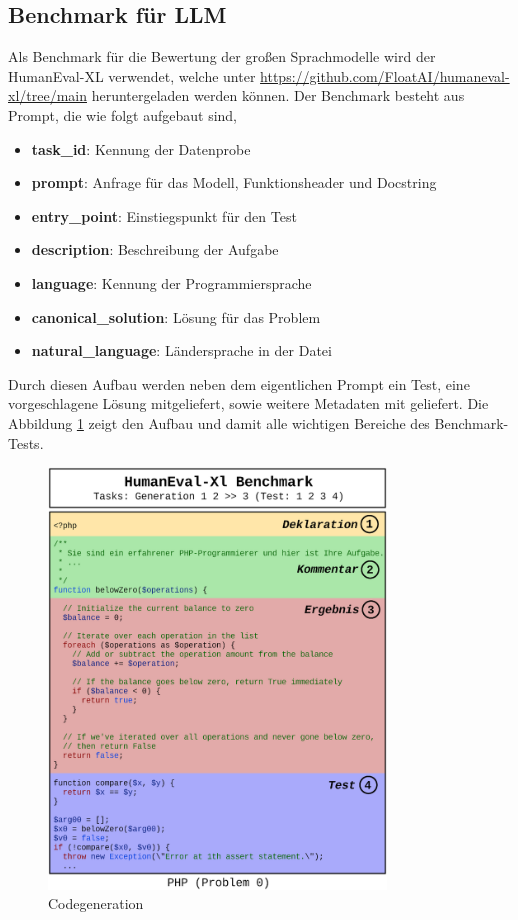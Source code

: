 \subsection{Benchmark für LLM}
Als Benchmark für die Bewertung der großen Sprachmodelle wird der HumanEval-XL verwendet, welche unter \href{https://github.com/FloatAI/humaneval-xl/tree/main}{https://github.com/FloatAI/humaneval-xl/tree/main} heruntergeladen werden können. Der Benchmark besteht aus Prompt, die wie folgt aufgebaut sind,

\begin{itemize}
	\item \textbf{task\_id}: Kennung der Datenprobe
	\item \textbf{prompt}: Anfrage für das Modell, Funktionsheader und Docstring
	\item \textbf{entry\_point}: Einstiegspunkt für den Test
	\item \textbf{description}: Beschreibung der Aufgabe
	\item \textbf{language}: Kennung der Programmiersprache
	\item \textbf{canonical\_solution}: Lösung für das Problem
	\item \textbf{natural\_language}: Ländersprache in der Datei
\end{itemize}

Durch diesen Aufbau werden neben dem eigentlichen Prompt ein Test, eine vorgeschlagene Lösung mitgeliefert, sowie weitere Metadaten mit geliefert. Die Abbildung \ref{img:code_generation_humaneval} zeigt den Aufbau und damit alle wichtigen Bereiche des Benchmark-Tests.

\begin{figure}[!ht]
	\includegraphics[width=0.8\textwidth]{content/chapter_intruduction/images/code_generation_humaneval_x.eps}
	\centering
	\caption{Codegeneration}
	\label{img:code_generation_humaneval}
\end{figure}


